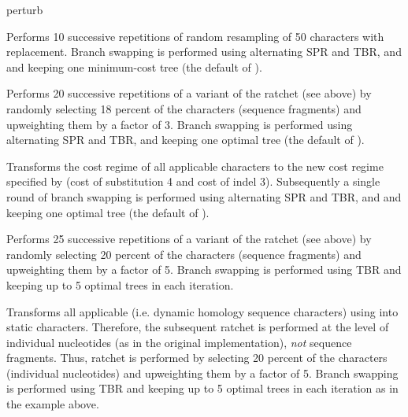 \begin{command}{perturb}{}
\begin{poyexamples}

{Performs 10 successive repetitions of random resampling of 50
characters with replacement. Branch swapping is performed
using alternating SPR and TBR, and and keeping one minimum-cost tree
(the default of ).}

{Performs 20 successive repetitions of a variant of the ratchet (see
above) by randomly selecting 18 percent of the characters (sequence
fragments) and upweighting them by a factor of 3. Branch swapping is
performed using alternating SPR and TBR, and keeping one
optimal tree (the default of ).}

{Transforms the cost regime of all applicable characters to the new 
cost regime specified by  (cost of substitution 
4 and cost of indel 3). Subsequently a single round of branch swapping is
performed using alternating SPR and TBR, and and keeping one
optimal tree (the default of ).}

{Performs 25 successive repetitions of a variant of the ratchet (see
above) by randomly selecting 20 percent of the characters (sequence
fragments) and upweighting them by a factor of 5. Branch swapping is
performed using TBR and keeping up to 5 optimal trees in each iteration.}

{Transforms all applicable (i.e. dynamic homology sequence
characters) using  into static characters.
Therefore, the subsequent ratchet is performed at the level of
individual nucleotides (as in the original implementation),
\emph{not} sequence fragments. Thus, ratchet is performed by
selecting 20 percent of the characters (individual nucleotides) and
upweighting them by a factor of 5. Branch swapping is performed
using TBR and keeping up to 5 optimal trees in each iteration as in
the example above.}

\end{poyexamples}

\begin{poyalso}
\end{poyalso}

\end{command}

